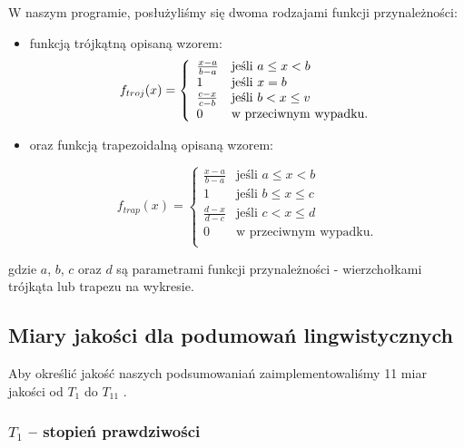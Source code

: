 \documentclass{classrep}
\begin{document}
W naszym programie, posłużyliśmy się dwoma rodzajami funkcji przynależności:

\begin{itemize}[label=$\bullet$\scshape\bfseries]
\item funkcją trójkątną opisaną wzorem:
\begin{equation}
{f}_{troj}(x)= \left\{ \begin{array}{ll}
\frac{x-a}{b-a} 	& \textrm{jeśli $a \leq x < b$} \\
1 			& \textrm{jeśli $ x = b $} \\
\frac{c-x}{c-b} 	& \textrm{jeśli $b < x \leq v$} \\
0 			& \textrm{w przeciwnym wypadku.} \\
\end{array} \right.
\end{equation}


\item oraz funkcją trapezoidalną opisaną wzorem:

\begin{equation}
{f}_{trap}(x)= \left\{ \begin{array}{ll}
\frac{x-a}{b-a} 	& \textrm{jeśli $a \leq x < b$} \\
1 			& \textrm{jeśli $b \leq x \leq c$} \\
\frac{d-x}{d-c} 	& \textrm{jeśli $c < x \leq d$} \\
0 			& \textrm{w przeciwnym wypadku.} \\
\end{array} \right.
\end{equation}


\end{itemize}

gdzie $a$, $b$, $c$ oraz $d$ są parametrami funkcji przynależności - wierzchołkami trójkąta lub trapezu na wykresie.




\subsection{Miary jakości dla podumowań lingwistycznych}

Aby określić jakość naszych podsumowaniań zaimplementowaliśmy 11 miar jakości od $T_1$ do $T_{11}$ \cite{ksiazka}.

\subsubsection{\(T_1\) -- stopień prawdziwości}
\end{document}
